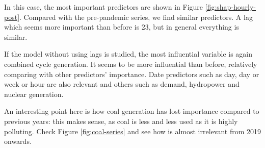 In this case, the most important predictors are shown in Figure \ref{fig:shap-hourly-post}. Compared with the pre-pandemic series, we find similar predictors. A lag which seems more important than before is 23, but in general everything is similar.

If the model without using lags is studied, the most influential variable is again combined cycle generation. It seems to be more influential than before, relatively comparing with other predictors' importance. Date predictors such as day, day or week or hour are also relevant and others such as demand, hydropower and nuclear generation.

An interesting point here is how coal generation has lost importance compared to previous years: this makes sense, as coal is less and less used as it is highly polluting. Check Figure \ref{fig:coal-series} and see how is almost irrelevant from 2019 onwards.

